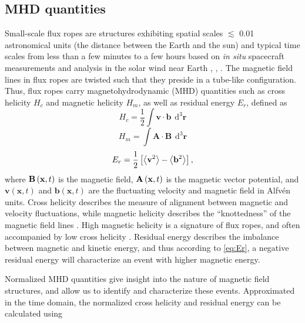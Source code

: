 \subsection{MHD quantities}
Small-scale flux ropes are structures exhibiting spatial scales $\lesssim$ 0.01 astronomical units (the distance between the Earth and the sun) and typical time scales from less than a few minutes to a few hours based on \textit{in situ} spacecraft measurements and analysis in the solar wind near Earth \cite{Cartwright:2010}, \cite{Feng:2007}, \cite{Hu:2018}. The magnetic field lines in flux ropes are twisted such that they preside in a tube-like configuration. Thus, flux ropes carry magnetohydrodynamic (MHD) quantities such as cross helicity $H_c$ and magnetic helicity $H_m$, as well as residual energy $E_r$, defined as
\begin{equation}
    H_c = \frac{1}{2}\int \mathbf{v}\cdot\mathbf{b} \hspace{5pt} \mathrm{d^3} \mathbf{r}
    \label{eq:Hc}
\end{equation}
\begin{equation}
    H_m = \int \mathbf{A}\cdot\mathbf{B} \hspace{5pt} \mathrm{d^3} \mathbf{r}
    \label{eq:Hm}
\end{equation}
\begin{equation}
    E_r = \frac{1}{2} \left[ \left \langle \mathbf{v}^2 \right\rangle  - \left \langle \mathbf{b}^2 \right\rangle \right],
    \label{eq:Er}
\end{equation}
where $\mathbf{B}\left( \mathbf{x},t \right)$ is the magnetic field, $\mathbf{A}\left( \mathbf{x},t \right)$ is the magnetic vector potential, and $\mathbf{v}(\mathbf{x},t)$ and $\mathbf{b}(\mathbf{x},t)$ are the fluctuating velocity and magnetic field in Alfv\'en units. Cross helicity describes the measure of alignment between magnetic and velocity fluctuations, while magnetic helicity describes the “knottedness” of the magnetic field lines \cite{Matthaeus:1982}. High magnetic helicity is a signature of flux ropes, and often accompanied by low cross helicity \cite{Zhao:2020}. Residual energy describes the imbalance between magnetic and kinetic energy, and thus according to \eqref{eq:Er}, a negative residual energy will characterize an event with higher magnetic energy.

Normalized MHD quantities give insight into the nature of magnetic field structures, and allow us to identify and characterize these events. Approximated in the time domain, the normalized cross helicity and residual energy can be calculated using

